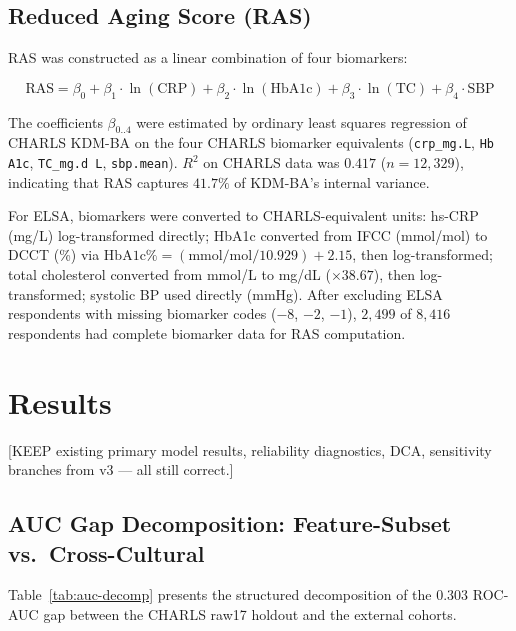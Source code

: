 \documentclass[11pt,a4paper]{article}
\begin{document}
\subsection{Reduced Aging Score (RAS)}
\label{sec:ras}

RAS was constructed as a linear combination of four biomarkers:

\[
\text{RAS} = \beta_0 + \beta_1 \cdot \ln(\text{CRP}) + \beta_2 \cdot \ln(\text{HbA1c})
           + \beta_3 \cdot \ln(\text{TC}) + \beta_4 \cdot \text{SBP}
\]

The coefficients $\beta_{0..4}$ were estimated by ordinary least squares regression of
CHARLS KDM-BA on the four CHARLS biomarker equivalents
(\texttt{crp\_mg.L}, \texttt{Hb A1c}, \texttt{TC\_mg.d L}, \texttt{sbp.mean}).
$R^2$ on CHARLS data was $0.417$ ($n=12{,}329$), indicating that RAS captures
$41.7\%$ of KDM-BA's internal variance.

For ELSA, biomarkers were converted to CHARLS-equivalent units: hs-CRP (mg/L)
log-transformed directly; HbA1c converted from IFCC (mmol/mol) to DCCT (\%) via
$\text{HbA1c}\% = (\text{mmol/mol} / 10.929) + 2.15$, then log-transformed; total
cholesterol converted from mmol/L to mg/dL ($\times 38.67$), then log-transformed;
systolic BP used directly (mmHg). After excluding ELSA respondents with missing
biomarker codes ($-8$, $-2$, $-1$), $2{,}499$ of $8{,}416$ respondents had complete
biomarker data for RAS computation.

\section{Results}

[KEEP existing primary model results, reliability diagnostics, DCA, sensitivity branches
from v3 — all still correct.]

\subsection{AUC Gap Decomposition: Feature-Subset vs.\ Cross-Cultural}

Table~\ref{tab:auc-decomp} presents the structured decomposition of the
$0.303$ ROC-AUC gap between the CHARLS raw17 holdout and the external cohorts.
\end{document}
